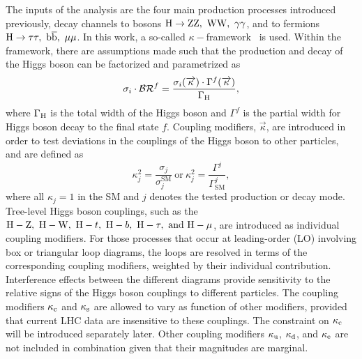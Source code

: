 The inputs of the analysis are the four main production processes introduced previously, decay channels to bosons $\mathrm{H}\to\mathrm{Z}\mathrm{Z},\ \mathrm{W}\mathrm{W},\ \gamma\gamma$, and to fermions $\PH\to\PGt\PGt,\ \bbbar,\ \PGm\PGm$. In this work, a so-called $\kappa-$framework~\cite{Heinemeyer:2013tqa} is used\footnotemark. 
Within the framework, there are assumptions made such that the production and decay of the Higgs boson can be factorized and parametrized as 
\begin{equation}
\sigma_{i}\cdot\mathcal{BR}^{f}=\frac{\sigma_{i}(\overrightarrow{\kappa})\cdot\Gamma^{f}(\overrightarrow{\kappa})}{\Gamma_{\mathrm{H}}},
\end{equation}
where $\Gamma_{\mathrm{H}}$ is the total width of the Higgs boson and $\Gamma^{f}$ is the partial width for Higgs boson decay to the final state $f$. Coupling modifiers, $\overrightarrow{\kappa}$, are introduced in order to test deviations in the couplings of the Higgs boson to other particles, and are defined as 
\begin{equation}
\kappa_{j}^{2}=\frac{\sigma_{j}}{\sigma_{j}^{\text{SM}}}\ \text{or}\ \kappa_{j}^{2}=\frac{\Gamma^{j}}{\Gamma^{j}_{\text{SM}}},
\end{equation}
where all $\kappa_{j}=1$ in the SM and $j$ denotes the tested production or decay mode.
Tree-level Higgs boson couplings, such as the $\PH-\cPZ,\ \PH-\PW,\ \PH-t,\ \PH-b,\ \PH-\PGt,\ \text{and}\ \PH-\PGm$, are introduced as individual coupling modifiers. For those processes that occur at leading-order (LO) involving box or triangular loop diagrams, the loops are resolved in terms of the corresponding coupling modifiers, weighted by their individual contribution. Interference effects between the different diagrams provide sensitivity to the relative signs of the Higgs boson couplings to different particles. The coupling modifiers $\kappa_{\mathrm{c}}$ and $\kappa_{\mathrm{s}}$ are allowed to vary as function of other modifiers, provided that current LHC data are insensitive to these couplings. The constraint on $\kappa_{\mathrm{c}}$ will be introduced separately later. Other coupling modifiers $\kappa_{\mathrm{u}}$, $\kappa_{\mathrm{d}}$, and $\kappa_{\mathrm{e}}$ are not included in combination given that their magnitudes are marginal. 

